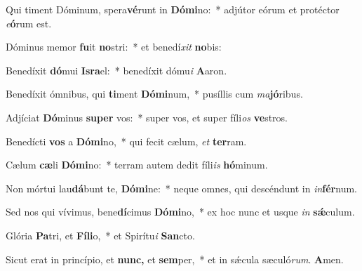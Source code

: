 \item Qui timent Dóminum, spera\textbf{vé}runt in \textbf{Dó}\textbf{mi}no:~* adjútor eórum et protéctor \textit{e}\textbf{ó}rum est.
\item Dóminus memor \textbf{fu}it \textbf{no}stri:~* et benedí\textit{xit} \textbf{no}bis:
\item Benedíxit \textbf{dó}mui \textbf{Is}\textbf{ra}el:~* benedíxit dómu\textit{i} \textbf{A}aron.
\item Benedíxit ómnibus, qui \textbf{ti}ment \textbf{Dó}\textbf{mi}num,~* pusíllis cum \textit{ma}\textbf{jó}ribus.
\item Adjíciat \textbf{Dó}minus \textbf{su}\textbf{per} vos:~* super vos, et super fíli\textit{os} \textbf{ve}stros.
\item Benedícti \textbf{vos} a \textbf{Dó}\textbf{mi}no,~* qui fecit cælum, \textit{et} \textbf{ter}ram.
\item Cælum \textbf{cæ}li \textbf{Dó}\textbf{mi}no:~* terram autem dedit fíli\textit{is} \textbf{hó}minum.
\item Non mórtui lau\textbf{dá}bunt te, \textbf{Dó}\textbf{mi}ne:~* neque omnes, qui descéndunt in \textit{in}\textbf{fér}num.
\item Sed nos qui vívimus, bene\textbf{dí}cimus \textbf{Dó}\textbf{mi}no,~* ex hoc nunc et usque \textit{in} \textbf{sǽ}culum.
\item Glória \textbf{Pa}tri, et \textbf{Fí}\textbf{li}o,~* et Spirítu\textit{i} \textbf{San}cto.
\item Sicut erat in princípio, et \textbf{nunc,} et \textbf{sem}per,~* et in sǽcula sæculó\textit{rum}. \textbf{A}men.
